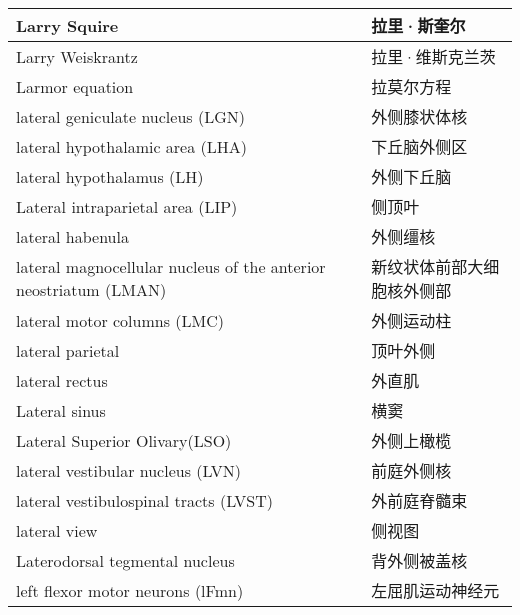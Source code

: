 \begin{longtable}{lll}
	\midrule
	Larry Squire   && 拉里·斯奎尔  \\
	
	\midrule
	Larry Weiskrantz   && 拉里·维斯克兰茨  \\
	
	\midrule
	Larmor equation   && 拉莫尔方程  \\
	
	\midrule
	lateral geniculate nucleus (LGN)   && 外侧膝状体核  \\
	
	\midrule
	lateral hypothalamic area (LHA)  && 下丘脑外侧区  \\
	
	\midrule
	lateral hypothalamus (LH)  && 外侧下丘脑  \\
	
	\midrule
	Lateral intraparietal area (LIP)   && 侧顶叶  \\
	
	\midrule
	lateral habenula   && 外侧缰核  \\
	
	\midrule
	lateral magnocellular nucleus of the anterior neostriatum (LMAN)  && 新纹状体前部大细胞核外侧部  \\
	
	\midrule
	lateral motor columns (LMC)   && 外侧运动柱  \\
	
	\midrule
	lateral parietal   && 顶叶外侧  \\
	
	\midrule
	lateral rectus   && 外直肌  \\
	
	\midrule
	Lateral sinus   && 横窦  \\
	
	\midrule
	Lateral Superior Olivary(LSO)   && 外侧上橄榄  \\
	
	\midrule
	lateral vestibular nucleus (LVN)  && 前庭外侧核  \\
	
	\midrule
	lateral vestibulospinal tracts (LVST)  && 外前庭脊髓束  \\
	
	\midrule
	lateral view   && 侧视图  \\
	
	\midrule
	Laterodorsal tegmental nucleus   && 背外侧被盖核  \\
	
	\midrule
	left flexor motor neurons (lFmn)   && 左屈肌运动神经元  \\
	

\end{longtable}
